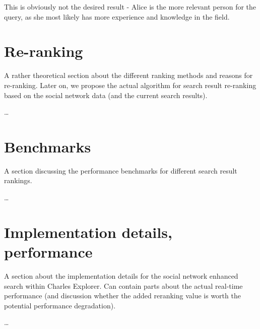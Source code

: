 This is obviously not the desired result - Alice is the more relevant person for the query, as she most likely has more experience and knowledge in the field.


\section{Re-ranking}

A rather theoretical section about the different ranking methods and reasons for re-ranking. Later on, we propose the actual algorithm for search result re-ranking based on the social network data (and the current search results). 

\dots

\section{Benchmarks}

A section discussing the performance benchmarks for different search result rankings.

\dots

\section{Implementation details, performance}

A section about the implementation details for the social network enhanced search within Charles Explorer. Can contain parts about the actual real-time performance (and discussion whether the added reranking value is worth the potential performance degradation).

\dots

